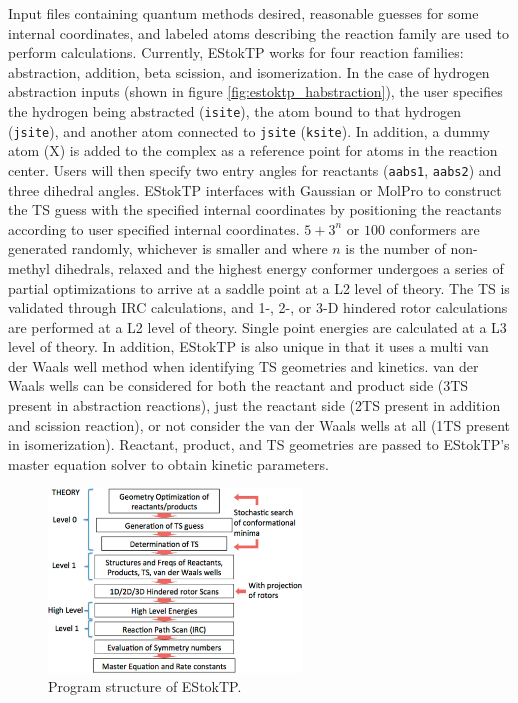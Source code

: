 \documentclass[preprint, 11pt]{elsarticle} %
\begin{document}
Input files containing quantum methods desired, reasonable guesses for some internal coordinates, and labeled atoms describing the reaction family are used to perform calculations.
Currently, EStokTP works for four reaction families: abstraction, addition, beta scission, and isomerization. 
In the case of hydrogen abstraction inputs (shown in figure \ref{fig:estoktp_habstraction}), the user specifies the hydrogen being abstracted (\texttt{isite}), the atom bound to that hydrogen (\texttt{jsite}), and another atom connected to \texttt{jsite} (\texttt{ksite}).
In addition, a dummy atom (X) is added to the complex as a reference point for atoms in the reaction center.
Users will then specify two entry angles for reactants (\texttt{aabs1}, \texttt{aabs2}) and three dihedral angles.
EStokTP interfaces with Gaussian \cite{Gaussian:2009} or MolPro \cite{molpro:2012} to construct the TS guess with the specified internal coordinates by positioning the reactants according to user specified internal coordinates. 
$5 + 3^n$ or $100$ conformers are generated randomly, whichever is smaller and where $n$ is the number of non-methyl dihedrals, relaxed and the highest energy conformer undergoes a series of partial optimizations to arrive at a saddle point at a L2 level of theory. 
The TS is validated  through IRC calculations, and 1-, 2-, or 3-D hindered rotor calculations are performed at a L2 level of theory.
Single point energies are calculated at a L3 level of theory.
In addition, EStokTP is also unique in that it uses a multi van der Waals well method when identifying TS geometries and kinetics.
van der Waals wells can be considered for both the reactant and product side (3TS present in abstraction reactions), just the reactant side (2TS present in addition and scission reaction), or not consider the van der Waals wells at all (1TS present in isomerization).
Reactant, product, and TS geometries are passed to EStokTP's master equation solver to obtain kinetic parameters.


\begin{figure}
    \centering
    \includegraphics[width=0.6\textwidth]{estoktp.png}
    \caption{Program structure of EStokTP.}
    \label{fig:estoktp_structure}
\end{figure}
\end{document}

